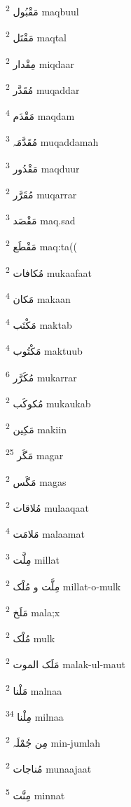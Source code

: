 \documentclass[12pt]{article}
\begin{document}
\begin{RTL}
\begin{multicols}{5}
{\ur مَقْبُول}   \textsuperscript{2} maqbuul

{\ur مَقْتَل}   \textsuperscript{2} maqtal

{\ur مِقْدار}   \textsuperscript{2} miqdaar

{\ur مُقَدَّر}   \textsuperscript{2} muqaddar

{\ur مَقْدَم}   \textsuperscript{4} maqdam

{\ur مُقَدَّمَہ}   \textsuperscript{3} muqaddamah

{\ur مَقْدُور}   \textsuperscript{3} maqduur

{\ur مُقَرَّر}   \textsuperscript{2} muqarrar

{\ur مَقْصَد}   \textsuperscript{3} maq.sad

{\ur مَقْطَع}   \textsuperscript{2} maq:ta((

{\ur مُکافات}   \textsuperscript{2} mukaafaat

{\ur مَکان}   \textsuperscript{4} makaan

{\ur مَکْتَب}   \textsuperscript{4} maktab

{\ur مَکْتُوب}   \textsuperscript{4} maktuub

{\ur مُکَرَّر}   \textsuperscript{6} mukarrar

{\ur مُکوکَب}   \textsuperscript{2} mukaukab

{\ur مَکِین}   \textsuperscript{2} makiin

{\ur مَگَر}   \textsuperscript{25} magar

{\ur مَگَس}   \textsuperscript{2} magas

{\ur مُلاقات}   \textsuperscript{2} mulaaqaat

{\ur مَلامَت}   \textsuperscript{4} malaamat

{\ur مِلَّت}   \textsuperscript{3} millat

{\ur مِلَّت و مُلْک}   \textsuperscript{2} millat-o-mulk

{\ur مَلَخ}   \textsuperscript{2} mala;x

{\ur مُلْک}   \textsuperscript{2} mulk

{\ur مَلَک الموت}   \textsuperscript{2} malak-ul-maut

{\ur مَلْنا}   \textsuperscript{2} malnaa

{\ur مِلْنا}   \textsuperscript{34} milnaa

{\ur مِن جُمْلَہ}   \textsuperscript{2} min-jumlah

{\ur مُناجات}   \textsuperscript{2} munaajaat

{\ur مِنَّت}   \textsuperscript{5} minnat


\end{multicols}
\end{RTL}
\end{document}
